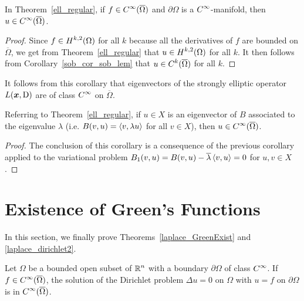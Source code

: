 \begin{cor} \label{ell_fCi_uCi}
In Theorem~\ref{ell_regular}, if
$\displaystyle f \in C^\infty(\overline{\Omega})$
and $\partial \Omega$ is a $\displaystyle C^\infty$-manifold, then
$\displaystyle u\in C^\infty(\overline{\Omega})$.
\end{cor}

\begin{proof}
Since $\displaystyle f \in H^{k,2}(\Omega)$ for all $k$
because all the derivatives of $f$ are bounded on $\overline{\Omega}$, 
we get from
Theorem~\ref{ell_regular} that $\displaystyle u \in H^{k,2}(\Omega)$
for all $k$.  It then follows from Corollary~\ref{sob_cor_sob_lem} that
$\displaystyle u \in C^k(\overline{\Omega})$ for all $k$.
\end{proof}

It follows from this corollary that eigenvectors of the strongly
elliptic operator $L({\bm{x}},\operatorname{D})$ are of class $\displaystyle C^\infty$ on
$\overline{\Omega}$.

\begin{cor}
Referring to Theorem~\ref{ell_regular}, if $u \in X$ is an eigenvector
of $B$ associated to the eigenvalue $\lambda$ (i.e.
$B(v,u) = \left\langle{v} , {\lambda u}\right\rangle$ for all $v \in X$), then
$\displaystyle u \in C^\infty(\overline{\Omega})$.
\end{cor}

\begin{proof}
The conclusion of this corollary is a consequence of the previous
corollary applied to the variational problem
$B_1(v,u) = B(v,u) - \overline{\lambda}\left\langle{v} , {u}\right\rangle = 0$ for $u,v \in X$.
\end{proof}

\section{Existence of Green's Functions} \label{ell_GreenF}

In this section, we finally prove Theorems~\ref{laplace_GreenExist}
and \ref{laplace_dirichlet2}.

\begin{prop} \label{ell_GreenF_prop}
Let $\Omega$ be a bounded open subset of $\displaystyle \mathbb{R}^n$ with a boundary
$\partial \Omega$ of class $\displaystyle C^\infty$.  If
$\displaystyle f \in C^\infty(\overline{\Omega})$,
the solution of the Dirichlet problem $\Delta u = 0$ on $\Omega$ with
$u=f$ on $\partial \Omega$ is in $\displaystyle C^\infty(\overline{\Omega})$.
\end{prop}


